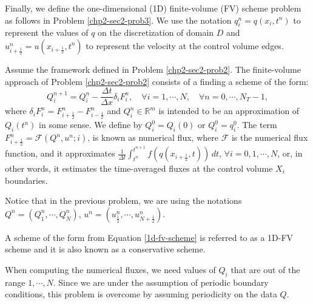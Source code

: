 Finally, we define the one-dimensional (1D) finite-volume (FV)
scheme problem as follows in Problem \ref{chp2-sec2-prob3}.
We use the notation ${q}^n_{i} = {q}(x_i, t^{n})$
to represent the values of ${q}$ on the discretization of domain $D$
and $u_{i+\frac{1}{2}}^n = u(x_{i+\frac{1}{2}},t^{n})$
to represent the velocity at the control volume edges.
\begin{prob}[1D-FV scheme]
	\label{chp2-sec2-prob3}
	Assume the framework defined in Problem \ref{chp2-sec2-prob2}.
	The finite-volume approach of Problem \ref{chp2-sec2-prob2}
	consists of a finding a scheme of the form:
        \begin{equation}
					\label{1d-fv-scheme}
		{Q}_{i}^{n+1} =  {Q}_{i}^{n} -
            \frac{\Delta t}{\Delta x} \delta_i {F}_{i}^{n},
                \quad \forall i = 1, \cdots, N,
                \quad \forall n = 0, \cdots, N_T-1,
        \end{equation}
	where $\delta_i {F}_{i}^{n} = 
    {F}_{i+\frac{1}{2}}^{n} - {F}_{i-\frac{1}{2}}^{n}$
    and ${Q}_{i}^{n} \in \mathbb{R}^m$ is intended to be an approximation
	of ${Q}_i(t^{n})$ in some sense. We define by
    ${Q}_{i}^{0} = {Q}_i(0)$ or ${Q}_{i}^{0} = {q}^{0}_{i}$. 
	The term ${F}_{i+\frac{1}{2}}^{n} = \mathcal{F}
    (Q^{n}, u^n ;i)$, is known as numerical flux, where $\mathcal{F}$ 
    is the numerical flux function, and it approximates
	$\frac{1}{\Delta t}\int_{t^{n}}^{t^{n+1}} 
    {f}({q}(x_{i+\frac{1}{2}}, t)) \,dt $,
	$\forall i = 0, 1, \cdots, N$,
	or, in other words, it estimates the time-averaged fluxes at
    the control volume $X_i$ boundaries.
\end{prob}

\begin{remark}
Notice that in the previous problem, we are using the notations 
$Q^n = (Q_1^n, \cdots, Q_N^n)$, $u^n = (u_{\frac{1}{2}}^n, \cdots, u_{N+\frac{1}{2}}^n)$.
\end{remark}

\begin{remark}
	A scheme of the form from Equation \eqref{1d-fv-scheme} is referred to as a 1D-FV scheme and
	it is also known as a conservative scheme.
\end{remark}

\begin{remark}
	When computing the numerical fluxes, we need values of $Q_i$ that are out of the range $1,\cdots, N$.
	Since we are under the assumption of periodic boundary conditions, this problem
	is overcome by assuming periodicity on the data $Q$.
\end{remark}

